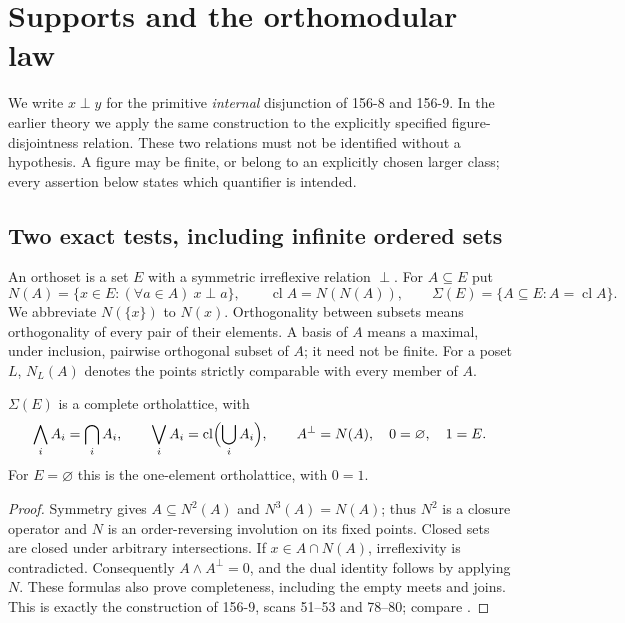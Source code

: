 \section{Supports and the orthomodular law}
\label{sec:supports}

We write $x\perp y$ for the primitive \emph{internal} disjunction of
156-8 and 156-9. In the earlier theory we apply the same construction to
the explicitly specified figure-disjointness relation. These two
relations must not be identified without a hypothesis. A figure may be
finite, or belong to an explicitly chosen larger class; every assertion
below states which quantifier is intended.

\subsection{Two exact tests, including infinite ordered sets}

\begin{definition}\label{SA21-A01}
An orthoset is a set $E$ with a symmetric irreflexive relation $\perp$.
For $A\subseteq E$ put
\[
 N(A)=\{x\in E:(\forall a\in A)\ x\perp a\},\qquad
 \operatorname{cl}A=N(N(A)),\qquad
 \Sigma(E)=\{A\subseteq E:A=\operatorname{cl}A\}.
\]
We abbreviate $N(\{x\})$ to $N(x)$. Orthogonality between subsets means
orthogonality of every pair of their elements. A basis of $A$ means a
maximal, under inclusion, pairwise orthogonal subset of $A$; it need not
be finite. For a poset $L$, $N_L(A)$ denotes the points strictly
comparable with every member of $A$.
\end{definition}

\begin{proposition}\label{SA21-A02}
$\Sigma(E)$ is a complete ortholattice, with
\[
 \bigwedge_i A_i=\bigcap_i A_i,\qquad
 \bigvee_i A_i=\operatorname{cl}\Bigl(\bigcup_iA_i\Bigr),\qquad
 A^\perp=N(A),\quad 0=\varnothing,\quad1=E.
\]
For $E=\varnothing$ this is the one-element ortholattice, with $0=1$.
\end{proposition}
\begin{proof}
Symmetry gives $A\subseteq N^2(A)$ and $N^3(A)=N(A)$; thus $N^2$ is a
closure operator and $N$ is an order-reversing involution on its fixed
points. Closed sets are closed under arbitrary intersections. If
$x\in A\cap N(A)$, irreflexivity is contradicted. Consequently
$A\wedge A^\perp=0$, and the dual identity follows by applying $N$.
These formulas also prove completeness, including the empty meets and
joins. This is exactly the construction of 156-9, scans 51--53 and
78--80; compare \citet[\S2]{Jenca2022}.
\end{proof}


